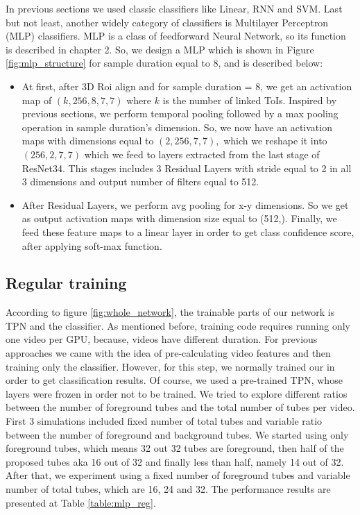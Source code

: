 In previous sections we used classic classifiers like Linear, RNN and SVM. Last but not least,
another widely category of classifiers  is Multilayer Perceptron (MLP) classifiers. MLP is a class of
feedforward Neural Network, so its function is described in chapter 2.
So, we design a MLP which is shown in Figure \ref{fig:mlp_structure} for sample duration equal to 8, and is described below:
\begin{itemize}
\item At first,  after 3D Roi align and for sample duration = 8, we get an activation map of $(k,256,8,7,7)$ where $k$ is the
  number of linked ToIs. Inspired by previous sections, we perform temporal pooling followed by a max pooling operation in
  sample duration's dimension. So, we now have an activation maps with dimensions equal to $(2,256,7,7),$ which we reshape
  it into $(256,2,7,7)$  which we feed to 
 layers  extracted from the last stage of ResNet34. This stages includes 3 Residual Layers
  with stride equal to 2 in all 3 dimensions and output number of filters equal to 512.

\item After Residual Layers, we perform avg pooling for x-y dimensions. So we get as output activation maps with dimension size
  equal to (512,).  Finally, we feed these feature maps to a linear layer in order to get class confidence score, after applying
  soft-max function.

\end{itemize}

\subsection{Regular training}
According to figure \ref{fig:whole_network}, the trainable parts of our network is TPN and the classifier.
As mentioned before, training code requires running only one video per GPU, because, videos have different duration. For previous approaches
we came with the idea of pre-calculating video features and then training only the classifier. However, for this step, we normally trained our
in order to get classification results. Of course, we used a pre-trained TPN, whose layers were frozen in order not to be trained.
We tried to explore different ratios between the number of foreground tubes and the total number of tubes per video. First 3 simulations included
fixed number of total tubes and variable ratio between the number of foreground and background tubes. We started using only foreground tubes, which
means 32 out 32 tubes are foreground, then half of the proposed tubes aka 16 out of 32 and finally less than half, namely 14 out of 32. After that,
we experiment using a fixed number of foreground tubes and variable number of total tubes, which are 16, 24 and 32. The performance results are presented
at Table \ref{table:mlp_reg}.

